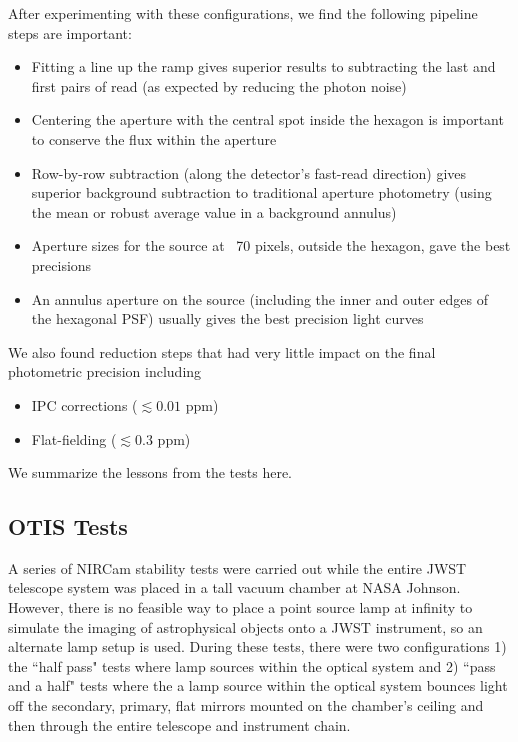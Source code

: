 \documentclass{aastex62}
\begin{document}
{After experimenting with these configurations, we find the following pipeline steps are important:
\begin{itemize}
	\item Fitting a line up the ramp gives superior results to subtracting the last and first pairs of read (as expected by reducing the photon noise)
	\item Centering the aperture with the central spot inside the hexagon is important to conserve the flux within the aperture
	\item Row-by-row subtraction (along the detector's fast-read direction) gives superior background subtraction to traditional aperture photometry (using the mean or robust average value in a background annulus)
	\item Aperture sizes for the source at ~70 pixels, outside the hexagon, gave the best precisions
	\item An annulus aperture on the source (including the inner and outer edges of the hexagonal PSF) usually gives the best precision light curves
\end{itemize}

We also found reduction steps that had very little impact on the final photometric precision including
\begin{itemize}
	\item IPC corrections ($\lesssim 0.01$ ppm)
	\item Flat-fielding ($\lesssim 0.3$ ppm)
\end{itemize}
We summarize the lessons from the tests here.

\subsection{OTIS Tests}

A series of NIRCam stability tests were carried out while the entire JWST telescope system was placed in a tall vacuum chamber at NASA Johnson.
However, there is no feasible way to place a point source lamp at infinity to simulate the imaging of astrophysical objects onto a JWST instrument, so an alternate lamp setup is used.
During these tests, there were two configurations 1) the ``half pass" tests where lamp sources within the optical system and 2) ``pass and a half" tests where the a lamp source within the optical system bounces light off the secondary, primary, flat mirrors mounted on the chamber's ceiling and then through the entire telescope and instrument chain.

}
\end{document}
